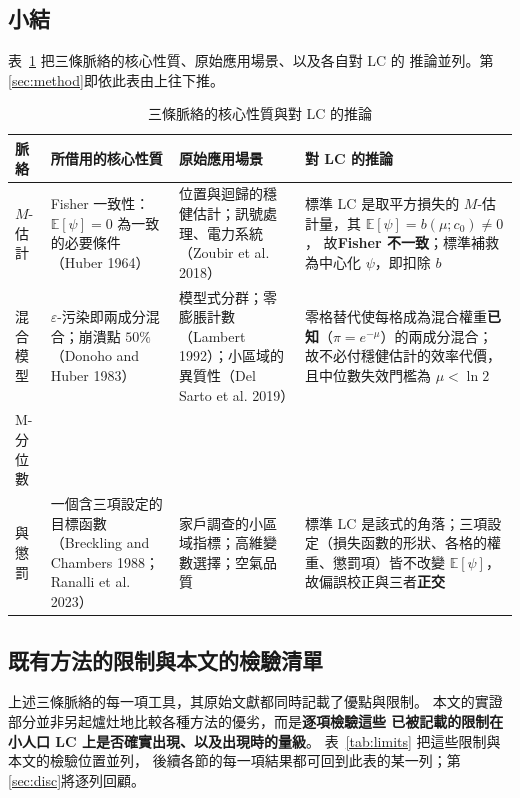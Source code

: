 \documentclass[UTF8, fontset=macnew, a4paper, 12pt]{ctexart}
\newcommand{\Ex}{\mathbb{E}}
\begin{document}
\subsection{小結}

表~\ref{tab:three} 把三條脈絡的核心性質、原始應用場景、以及各自對 LC 的
推論並列。第\ref{sec:method}即依此表由上往下推。

\begin{table}[H]
\centering
\caption{三條脈絡的核心性質與對 LC 的推論}
\footnotesize
\renewcommand{\arraystretch}{1.25}
\begin{tabular}{p{2.3cm}p{3.4cm}p{3.5cm}p{4.3cm}}
\toprule
脈絡 & 所借用的核心性質 & 原始應用場景 & 對 LC 的推論\\
\midrule
$M$-估計
& Fisher 一致性：$\Ex[\psi]=0$ 為一致的必要條件（Huber 1964）
& 位置與迴歸的穩健估計；訊號處理、電力系統（Zoubir et al. 2018）
& 標準 LC 是取平方損失的 $M$-估計量，其 $\Ex[\psi]=b(\mu;c_0)\ne0$，
  故\textbf{Fisher 不一致}；標準補救為中心化 $\psi$，即扣除 $b$\\
混合模型
& $\varepsilon$-污染即兩成分混合；崩潰點 $50\%$（Donoho and Huber 1983）
& 模型式分群；零膨脹計數（Lambert 1992）；小區域的異質性（Del Sarto et al. 2019）
& 零格替代使每格成為混合權重\textbf{已知}（$\pi=e^{-\mu}$）的兩成分混合；
  故不必付穩健估計的效率代價，且中位數失效門檻為 $\mu<\ln2$\\
M-分位數\\與懲罰
& 一個含三項設定的目標函數（Breckling and Chambers 1988；Ranalli et al. 2023）
& 家戶調查的小區域指標；高維變數選擇；空氣品質
& 標準 LC 是該式的角落；三項設定（損失函數的形狀、各格的權重、懲罰項）皆不改變
  $\Ex[\psi]$，故偏誤校正與三者\textbf{正交}\\
\bottomrule
\end{tabular}
\label{tab:three}
\end{table}

\subsection{既有方法的限制與本文的檢驗清單}\label{sec:limtable}

上述三條脈絡的每一項工具，其原始文獻都同時記載了優點與限制。
本文的實證部分並非另起爐灶地比較各種方法的優劣，而是\textbf{逐項檢驗這些
已被記載的限制在小人口 LC 上是否確實出現、以及出現時的量級}。
表~\ref{tab:limits} 把這些限制與本文的檢驗位置並列，
後續各節的每一項結果都可回到此表的某一列；第\ref{sec:disc}將逐列回顧。
\end{document}
